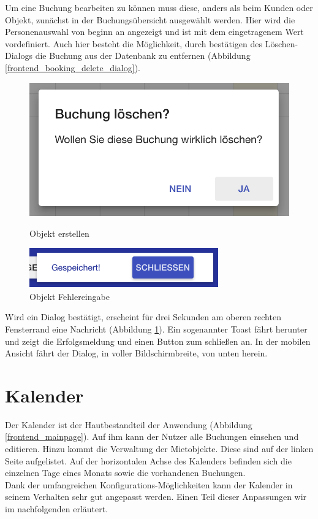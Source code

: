 Um eine Buchung bearbeiten zu können muss diese, anders als beim Kunden oder Objekt, zunächst in der Buchungsübersicht ausgewählt werden. Hier wird die Personenauswahl von beginn an angezeigt und ist mit dem eingetragenem Wert vordefiniert. Auch hier besteht die Möglichkeit, durch bestätigen des Löschen-Dialogs die Buchung aus der Datenbank zu entfernen (Abbildung \ref{frontend_booking_delete_dialog}).

\begin{figure}[H]
    \centering
    \begin{minipage}[t]{0.49\linewidth}
        \centering
        \includegraphics[width=\linewidth]{images/frontend_booking_delete_dialog.png}
        \caption{Objekt erstellen}
        \label{frontend_booking_delete_dialog}
    \end{minipage}
    \hfill
    \begin{minipage}[t]{0.49\linewidth}
        \centering
        \includegraphics[width=\linewidth]{images/frontend_toast.png}
        \caption{Objekt Fehlereingabe}
         \label{frontend_toast}
    \end{minipage}
\end{figure}

Wird ein Dialog bestätigt, erscheint für drei Sekunden am oberen rechten Fensterrand eine Nachricht (Abbildung \ref{frontend_toast}). Ein sogenannter Toast fährt herunter und zeigt die Erfolgsmeldung und einen Button zum schließen an. In der mobilen Ansicht fährt der Dialog, in voller Bildschirmbreite, von unten herein.

\section{Kalender}
Der Kalender ist der Hautbestandteil der Anwendung (Abbildung \ref{frontend_mainpage}). Auf ihm kann der Nutzer alle Buchungen einsehen und editieren. Hinzu kommt die Verwaltung der Mietobjekte. Diese sind auf der linken Seite aufgelistet. Auf der horizontalen Achse des Kalenders befinden sich die einzelnen Tage eines Monats sowie die vorhandenen Buchungen.\\ Dank der umfangreichen Konfigurations-Möglichkeiten kann der Kalender in seinem Verhalten sehr gut angepasst werden. Einen Teil dieser Anpassungen wir im nachfolgenden erläutert.

